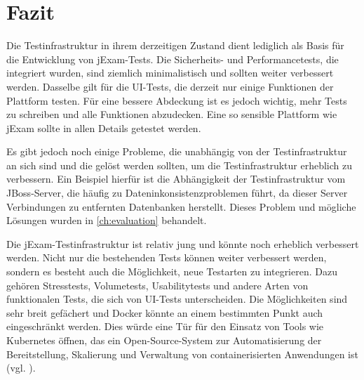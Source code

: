 \section{Fazit}

Die Testinfrastruktur in ihrem derzeitigen Zustand dient lediglich als
Basis für die Entwicklung von jExam-Tests. Die Sicherheits- und
Performancetests, die integriert wurden, sind ziemlich minimalistisch
und sollten weiter verbessert werden. Dasselbe gilt für die UI-Tests,
die derzeit nur einige Funktionen der Plattform testen. Für eine bessere
Abdeckung ist es jedoch wichtig, mehr Tests zu schreiben und alle Funktionen
abzudecken. Eine so sensible Plattform wie jExam sollte in allen Details
getestet werden.

Es gibt jedoch noch einige Probleme, die unabhängig von der Testinfrastruktur
an sich sind und die  gelöst werden sollten, um die Testinfrastruktur erheblich
zu verbessern. Ein Beispiel hierfür ist die Abhängigkeit der Testinfrastruktur
vom JBoss-Server, die häufig zu Dateninkonsistenzproblemen führt, da dieser
Server Verbindungen zu entfernten Datenbanken herstellt. Dieses Problem und
mögliche Lösungen wurden in \autoref{ch:evaluation} behandelt.

Die jExam-Testinfrastruktur ist relativ jung und könnte noch erheblich verbessert
werden. Nicht nur die bestehenden Tests können weiter verbessert werden, sondern
es besteht auch die Möglichkeit, neue Testarten zu integrieren. Dazu gehören
Stresstests, Volumetests, Usabilitytests und andere Arten von funktionalen
Tests, die sich von UI-Tests unterscheiden. Die Möglichkeiten sind sehr breit
gefächert und Docker könnte an einem bestimmten Punkt auch eingeschränkt werden.
Dies würde eine Tür für den Einsatz von Tools wie Kubernetes öffnen, das ein
Open-Source-System zur Automatisierung der Bereitstellung, Skalierung und
Verwaltung von containerisierten Anwendungen ist (vgl. \cite{kubernetes}).
